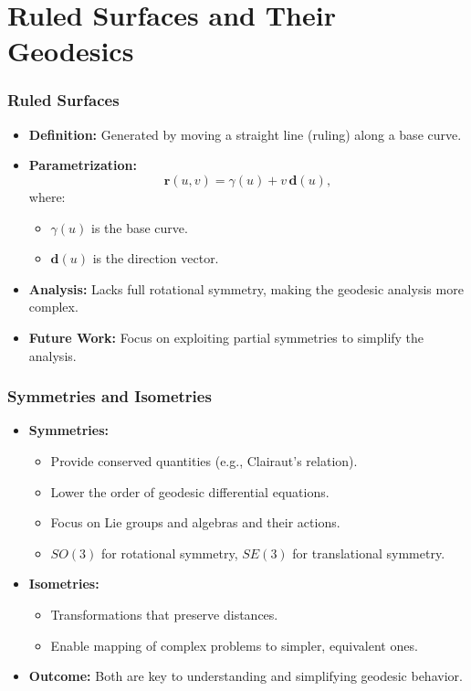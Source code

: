 \documentclass[12pt]{beamer}
\begin{document}
\section{Ruled Surfaces and Their Geodesics}
\begin{frame}
  \frametitle{Ruled Surfaces}
  \begin{itemize}
    \item \textbf{Definition:} Generated by moving a straight line (ruling) along a base curve.
    \item \textbf{Parametrization:}
      \[
      \mathbf{r}(u,v) = \gamma(u) + v\,\mathbf{d}(u),
      \]
      where:
      \begin{itemize}
         \item \(\gamma(u)\) is the base curve.
         \item \(\mathbf{d}(u)\) is the direction vector.
      \end{itemize}
    \item \textbf{Analysis:} Lacks full rotational symmetry, making the geodesic analysis more complex.
    \item \textbf{Future Work:} Focus on exploiting partial symmetries to simplify the analysis.
  \end{itemize}
\end{frame}

\begin{frame}
  \frametitle{Symmetries and Isometries}
  \begin{itemize}
    \item \textbf{Symmetries:}
      \begin{itemize}
         \item Provide conserved quantities (e.g., Clairaut's relation).
         \item Lower the order of geodesic differential equations.
         \item Focus on Lie groups and algebras and their actions.
         \item $SO(3)$ for rotational symmetry, $SE(3)$ for translational symmetry.
      \end{itemize}
    \item \textbf{Isometries:}
      \begin{itemize}
         \item Transformations that preserve distances.
         \item Enable mapping of complex problems to simpler, equivalent ones.
      \end{itemize}
    \item \textbf{Outcome:} Both are key to understanding and simplifying geodesic behavior.
  \end{itemize}
\end{frame}
\end{document}
